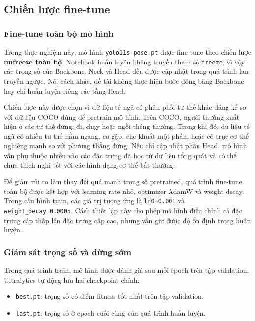 \documentclass[12pt, a4paper]{article}
\begin{document}
\subsection{Chiến lược fine-tune}
\label{subsec:fine_tune_strategy}

\subsubsection{Fine-tune toàn bộ mô hình}
Trong thực nghiệm này, mô hình \texttt{yolo11s-pose.pt} được fine-tune theo chiến lược \textbf{unfreeze toàn bộ}.
Notebook huấn luyện không truyền tham số \texttt{freeze}, vì vậy các trọng số của Backbone, Neck và Head đều được cập nhật trong quá trình lan truyền ngược.
Nói cách khác, đề tài không thực hiện bước đóng băng Backbone hay chỉ huấn luyện riêng các tầng Head.

Chiến lược này được chọn vì dữ liệu té ngã có phân phối tư thế khác đáng kể so với dữ liệu COCO dùng để pretrain mô hình.
Trên COCO, người thường xuất hiện ở các tư thế đứng, đi, chạy hoặc ngồi thông thường.
Trong khi đó, dữ liệu té ngã có nhiều tư thế nằm ngang, co gập, che khuất một phần, hoặc có trục cơ thể nghiêng mạnh so với phương thẳng đứng.
Nếu chỉ cập nhật phần Head, mô hình vẫn phụ thuộc nhiều vào các đặc trưng đã học từ dữ liệu tổng quát và có thể chưa thích nghi tốt với các hình dạng cơ thể bất thường.

Để giảm rủi ro làm thay đổi quá mạnh trọng số pretrained, quá trình fine-tune toàn bộ được kết hợp với learning rate nhỏ, optimizer AdamW và weight decay.
Trong cấu hình train, các giá trị tương ứng là \texttt{lr0=0.001} và \texttt{weight\_decay=0.0005}.
Cách thiết lập này cho phép mô hình điều chỉnh cả đặc trưng cấp thấp lẫn đặc trưng cấp cao, nhưng vẫn giữ được độ ổn định trong huấn luyện.

\subsubsection{Giám sát trọng số và dừng sớm}
Trong quá trình train, mô hình được đánh giá sau mỗi epoch trên tập validation.
Ultralytics tự động lưu hai checkpoint chính:
\begin{itemize}[nosep]
    \item \texttt{best.pt}: trọng số có điểm fitness tốt nhất trên tập validation.
    \item \texttt{last.pt}: trọng số ở epoch cuối cùng của quá trình huấn luyện.
\end{itemize}
\end{document}
